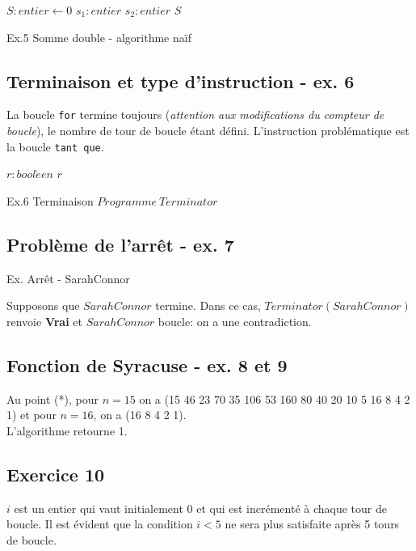 \documentclass{article}
\begin{document}
\begin{algorithm}[H]
\DontPrintSemicolon
{}
$S: entier \gets 0$\;
$s_1: entier$\;
$s_2: entier$\;
\Return $S$
\caption{Ex.5 Somme double - algorithme naïf}
\end{algorithm}

\subsection*{Terminaison et type d'instruction - ex. 6}
La boucle \texttt{for} termine toujours (\textit{attention aux modifications du compteur de boucle}), le nombre de tour de boucle étant défini.
L'instruction problématique est la boucle \texttt{tant que}.\\

\begin{algorithm}[H]
\DontPrintSemicolon
{}
$r: bool\acute{e}en$\;
\Return $r$
\caption{Ex.6 Terminaison $Programme\ Terminator$}
\end{algorithm}

\subsection*{Problème de l'arrêt - ex. 7}
\begin{algorithm}[H]
\DontPrintSemicolon
{}
\caption{Ex. Arrêt - SarahConnor}
\end{algorithm}
Supposons que $SarahConnor$ termine. Dans ce cas, $Terminator(SarahConnor)$ renvoie \textbf{Vrai} et $SarahConnor$ boucle: on a une contradiction.

\subsection*{Fonction de Syracuse - ex. 8 et 9}
Au point (*), pour $n=15$ on a (15 46 23 70 35 106 53 160 80 40 20 10 5 16 8 4 2 1) et pour $n=16$, on a
(16 8 4 2 1).\\
L'algorithme retourne 1.

\subsection*{Exercice 10}
$i$ est un entier qui vaut initialement $0$ et qui est incrémenté à chaque tour de boucle.
Il est évident que la condition $i<5$ ne sera plus satisfaite après 5 tours de boucle.
\end{document}
